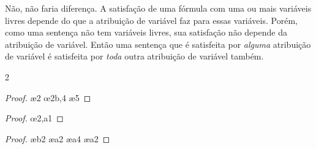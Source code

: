 \begin{earg}
\item Não, não faria diferença. A satisfação de uma fórmula com uma ou mais variáveis livres depende do que a atribuição de variável faz para essas variáveis. Porém, como uma sentença não tem variáveis livres, sua satisfação não depende da atribuição de variável. Então uma sentença que é satisfeita por \emph{alguma} atribuição de variável é satisfeita por \emph{toda} outra atribuição de variável também.
\end{earg}



\begin{multicols}{2}
\begin{proof}
\ae{2}
 
 \oe{2b,4}
 \ae{5}
\end{proof}

\begin{proof}
\open
	\oe{2,a1}
\close
{}
\end{proof}

\begin{proof}
\open
	 
	\open
		\ae{b2}
		\ae{a2}
	\close
	\ae{a4}
	\ae{a2}
\close
{}
\end{proof}
\end{multicols}

